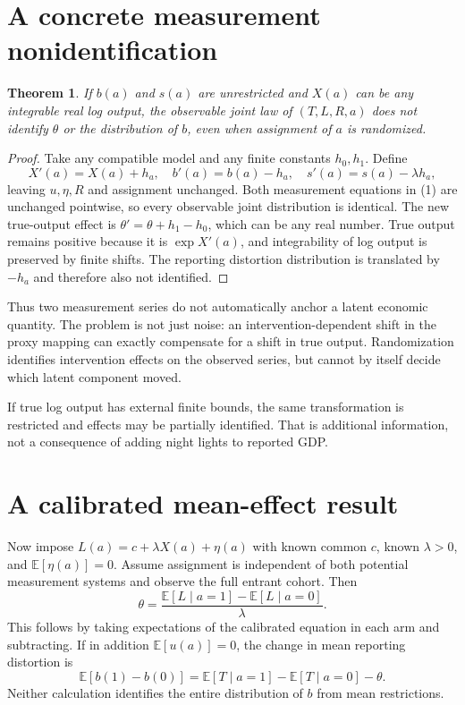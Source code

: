 \documentclass[11pt,a4paper]{article}
\newtheorem{theorem}{Theorem}[section]
\newcommand{\E}{\mathbb E}
\begin{document}
\section{A concrete measurement nonidentification}
\begin{theorem}
If $b(a)$ and $s(a)$ are unrestricted and $X(a)$ can be any integrable real log output, the observable joint law of $(T,L,R,a)$ does not identify $\theta$ or the distribution of $b$, even when assignment of $a$ is randomized.
\end{theorem}
\begin{proof}
Take any compatible model and any finite constants $h_0,h_1$. Define
\[
 X'(a)=X(a)+h_a,\quad b'(a)=b(a)-h_a,\quad
 s'(a)=s(a)-\lambda h_a,
\]
leaving $u,\eta,R$ and assignment unchanged. Both measurement equations in (1) are unchanged pointwise, so every observable joint distribution is identical. The new true-output effect is
$\theta'=\theta+h_1-h_0$, which can be any real number. True output remains positive because it is $\exp X'(a)$, and integrability of log output is preserved by finite shifts. The reporting distortion distribution is translated by $-h_a$ and therefore also not identified.
\end{proof}
Thus two measurement series do not automatically anchor a latent economic quantity. The problem is not just noise: an intervention-dependent shift in the proxy mapping can exactly compensate for a shift in true output. Randomization identifies intervention effects on the observed series, but cannot by itself decide which latent component moved.

If true log output has external finite bounds, the same transformation is restricted and effects may be partially identified. That is additional information, not a consequence of adding night lights to reported GDP.
\section{A calibrated mean-effect result}
Now impose
$L(a)=c+\lambda X(a)+\eta(a)$ with known common $c$, known $\lambda>0$, and
$\E[\eta(a)]=0$. Assume assignment is independent of both potential measurement systems and observe the full entrant cohort. Then
\[
 \theta=\frac{\E[L\mid a=1]-\E[L\mid a=0]}{\lambda}.
 \tag{2}
\]
This follows by taking expectations of the calibrated equation in each arm and subtracting. If in addition $\E[u(a)]=0$, the change in mean reporting distortion is
\[
 \E[b(1)-b(0)]
 =\E[T\mid a=1]-\E[T\mid a=0]-\theta.
 \tag{3}
\]
Neither calculation identifies the entire distribution of $b$ from mean restrictions.
\end{document}
